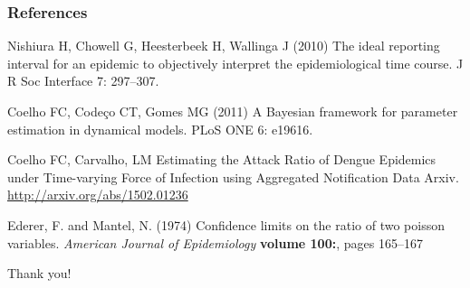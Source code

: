 \documentclass[10pt,compress,notheorems]{beamer}
\begin{document}
\begin{frame}[fragile]
\frametitle{References}
\begin{thebibliography}{10}
Nishiura H, Chowell G, Heesterbeek H, Wallinga J (2010) {{T}he ideal reporting
  interval for an epidemic to objectively interpret the epidemiological time
  course}.
\newblock J R Soc Interface 7: 297--307.

Coelho FC, Code\c{c}o CT, Gomes MG (2011) {A} {B}ayesian framework for
  parameter estimation in dynamical models.
\newblock PLoS ONE 6: e19616.

Coelho FC, Carvalho, LM {E}stimating the Attack Ratio of Dengue 
Epidemics under Time-varying Force of Infection using Aggregated Notification 
Data
\newblock Arxiv. \url{http://arxiv.org/abs/1502.01236}

Ederer, F. and Mantel, N. (1974)
\newblock Confidence limits on the ratio of two poisson
  variables.
\newblock \emph{American Journal of Epidemiology}
  \textbf{volume 100:}, pages 165--167

\end{thebibliography}

\end{frame}
% 
% 
\begin{frame}
  
 \begin{center}
\begin{Huge}Thank you!           \end{Huge} \end{center}
\end{frame}
\end{document}
